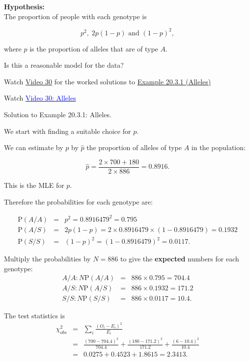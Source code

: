 \documentclass[
]{book}
\begin{document}
{\textbf{Hypothesis:}}\\
The proportion of people with each genotype is

\[ p^2, \; 2 p (1-p) \mbox{ and } (1-p)^2, \]

where \(p\) is the proportion of alleles that are of type \(A\).

Is this a reasonable model for the data?

Watch \protect\hyperlink{video30}{Video 30} for the worked solutions to \protect\hyperlink{Hypo_Test_Discrete:ex:alleles}{Example 20.3.1 (Alleles)}

Watch \href{https://mediaspace.nottingham.ac.uk/media/Allele+Example+FINAL+VERSION/1_bcyakzbp}{\textcolor{blue}{Video 30: Alleles}}

Solution to Example 20.3.1: Alleles.

\leavevmode{}%
We start with finding a suitable choice for \(p\).

We can estimate by \(p\) by \(\hat{p}\) the proportion of alleles of type \(A\) in the population:

\[\hat{p}= \frac{2 \times 700 + 180}{2 \times 886} = 0.8916. \]

This is the MLE for \(p\).

Therefore the probabilities for each genotype are:

\begin{eqnarray*}
\mathrm{P} (A/A) &=&p^2 = 0.8916479^2 = 0.795 \\
\mathrm{P} (A/S) &=& 2p(1-p) = 2\times  0.8916479 \times (1-0.8916479)= 0.1932 \\
\mathrm{P} (S/S) &=&(1-p)^2 = (1-0.8916479)^2 = 0.0117.
\end{eqnarray*}

Multiply the probabilities by \(N=886\) to give the {\textbf{expected}} numbers for each genotype:\\

\begin{eqnarray*}
A/A: N \mathrm{P} (A/A) &=& 886 \times 0.795 = 704.4 \\
A/S: N \mathrm{P} (A/S)  &=& 886 \times 0.1932 = 171.2 \\
S/S: N \mathrm{P} (S/S) &=& 886 \times 0.0117 = 10.4.
\end{eqnarray*}

The test statistics is\\

\begin{eqnarray*} \chi^2_{obs} &=& \sum_i \frac{(O_i - E_i)^2}{E_i} \\
&=& \frac{(700-704.4)^2}{704.4} + \frac{(180-171.2)^2}{171.2} + \frac{(6-10.4)^2}{10.4}  \\
&=& 0.0275 + 0.4523 + 1.8615 =  2.3413. \end{eqnarray*}
\end{document}
